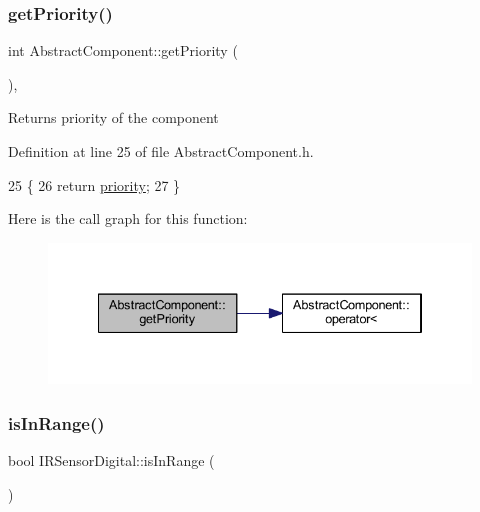 \subsubsection{\texorpdfstring{get\+Priority()}{getPriority()}}
{\footnotesize\ttfamily int Abstract\+Component\+::get\+Priority (\begin{DoxyParamCaption}{ }\end{DoxyParamCaption})\hspace{0.3cm}{\ttfamily [inline]}, {\ttfamily [inherited]}}

\begin{DoxyReturn}{Returns}
priority of the component 
\end{DoxyReturn}


Definition at line 25 of file Abstract\+Component.\+h.


\begin{DoxyCode}
25                       \{
26         \textcolor{keywordflow}{return} \hyperlink{class_abstract_component_aff57dfa5f31be093a06b55560e33fb95}{priority};
27     \}
\end{DoxyCode}
Here is the call graph for this function\+:\nopagebreak
\begin{figure}[H]
\begin{center}
\leavevmode
\includegraphics[width=334pt]{class_abstract_component_ac0b440d1d642ff1292ec3c544d75a8f1_cgraph}
\end{center}
\end{figure}
\mbox{\label{class_i_r_sensor_digital_a749b91dae3e83900f6de49fcc908470d}} 
\subsubsection{\texorpdfstring{is\+In\+Range()}{isInRange()}}
{\footnotesize\ttfamily bool I\+R\+Sensor\+Digital\+::is\+In\+Range (\begin{DoxyParamCaption}{ }\end{DoxyParamCaption})}

